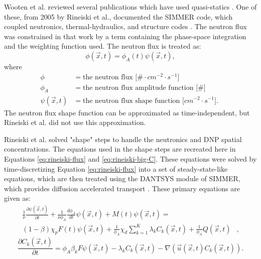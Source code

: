 Wooten et al. reviewed several publications which have used quasi-statics \cite{wooten2018review}.
One of these, from 2005 by Rineiski et al., documented the SIMMER code, which coupled neutronics, thermal-hydraulics, and structure codes \cite{rineiski2005kinetics}.
The neutron flux was constrained in that work by a term containing the phase-space integration and the weighting function used.
The neutron flux is treated as:
\begin{equation}
    \phi(\vec{x}, t) = \phi_A(t) \psi (\vec{x}, t),
    \label{eq:flux-treatment-rineiski}
\end{equation}
where
\begin{align}
    \phi &= \text{the neutron flux [$\# \cdot cm^{-2} \cdot s^{-1}$] } \nonumber \\
    \phi_A &= \text{the neutron flux amplitude function [$\#$]} \nonumber \\
    \psi (\vec{x}, t) &= \text {the neutron flux shape function [$cm^{-2} \cdot s^{-1}$]. }\nonumber 
\end{align}
The neutron flux shape function can be approximated as time-independent, but Rineiski et al. did not use this approximation.

Rineiski et al. solved "shape" steps to handle the neutronics and \gls{DNP} spatial concentrations.
The equations used in the shape steps are recreated here in Equations \eqref{eq:rineiski-flux} and \eqref{eq:rineiski-big-C}.
These equations were solved by time-discretizing Equation \eqref{eq:rineiski-flux} into a set of steady-state-like equations, which are then treated using the DANTSYS module of SIMMER, which provides diffusion accelerated transport \cite{alcouffe1995dantsys}.
These primary equations are given as:
\begin{equation}
\begin{split}
    \frac{1}{\bar{\nu}} \frac{\partial \psi (\vec{x}, t)}{\partial t} + \frac{1}{\bar{\nu} \phi_A} \frac{d \phi_A}{dt} \psi (\vec{x}, t) + M(t) \psi (\vec{x}, t) = & \\
    (1 - \beta) \chi_p F(t) \psi (\vec{x}, t)
    + \frac{1}{\phi_A} \chi_d \sum_{k=1}^K \lambda_k C_k (\vec{x}, t) + \frac{1}{\phi_A} Q (\vec{x}, t) & ,
    \label{eq:rineiski-flux}
\end{split}
\end{equation}
\begin{equation}
    \frac{\partial C_k (\vec{x}, t)}{\partial t} = \phi_A \beta_k F \psi (\vec{x}, t) - \lambda_k C_k (\vec{x}, t) - \nabla ( \vec{u} (\vec{x}, t) C_k (\vec{x}, t)).
    \label{eq:rineiski-big-C}
\end{equation}

